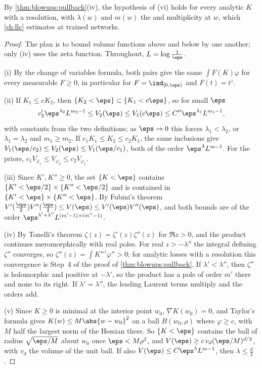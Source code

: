 \begin{refsection}
By \cref{thm:blowups:pullback}(iv), the hypothesis of (vi) holds for every analytic $K$ with a resolution, with $\lambda(w)$ and $m(w)$ the  and multiplicity at $w$, which \cref{ch:llc} estimates at trained networks.

\begin{proof}
The plan is to bound volume functions above and below by one another; only (iv) uses the zeta function. Throughout, $L=\log\frac1\eps$.

(i) By the change of variables formula, both pairs give the same $\int F(K)\varphi$ for every measurable $F\ge0$, in particular for $F=\ind_{[0,\eps)}$ and $F(t)=t^z$.

(ii) If $K_1\le cK_2$, then $\{K_2<\eps\}\subset\{K_1<c\eps\}$, so for small $\eps$
\[
c'_2\eps^{\lambda_2}L^{m_2-1}\le V_2(\eps)\le V_1(c\eps)\le C''\eps^{\lambda_1}L^{m_1-1},
\]
with constants from the two definitions; as $\eps\to0$ this forces $\lambda_1<\lambda_2$, or $\lambda_1=\lambda_2$ and $m_1\ge m_2$. If $c_1K_1\le K_2\le c_2K_1$, the same inclusions give $V_1(\eps/c_2)\le V_2(\eps)\le V_1(\eps/c_1)$, both of the order $\eps^\lambda L^{m-1}$. For the priors, $c_1V_{\varphi_1}\le V_{\varphi_2}\le c_2V_{\varphi_1}$.

(iii) Since $K',K''\ge0$, the set $\{K<\eps\}$ contains $\{K'<\eps/2\}\times\{K''<\eps/2\}$ and is contained in $\{K'<\eps\}\times\{K''<\eps\}$. By Fubini's theorem $V'(\frac\eps2)V''(\frac\eps2)\le V(\eps)\le V'(\eps)V''(\eps)$, and both bounds are of the order $\eps^{\lambda'+\lambda''}L^{(m'-1)+(m''-1)}$.

(iv) By Tonelli's theorem $\zeta(z)=\zeta'(z)\zeta''(z)$ for $\Re z>0$, and the product continues meromorphically with real poles. For real $z>-\lambda''$ the integral defining $\zeta''$ converges, so $\zeta''(z)=\int K''^z\varphi''>0$; for analytic losses with a resolution this convergence is Step~4 of the proof of \cref{thm:blowups:pullback}. If $\lambda'<\lambda''$, then $\zeta''$ is holomorphic and positive at $-\lambda'$, so the product has a pole of order $m'$ there and none to its right. If $\lambda'=\lambda''$, the leading Laurent terms multiply and the orders add.

(v) Since $K\ge0$ is minimal at the interior point $w_0$, $\nabla K(w_0)=0$, and Taylor's formula gives $K(w)\le M\abs{w-w_0}^2$ on a ball $B(w_0,\rho)$ where $\varphi\ge c$, with $M$ half the largest norm of the Hessian there. So $\{K<\eps\}$ contains the ball of radius $\sqrt{\eps/M}$ about $w_0$ once $\eps<M\rho^2$, and $V(\eps)\ge c\,v_d(\eps/M)^{d/2}$, with $v_d$ the volume of the unit ball. If also $V(\eps)\le C\eps^\lambda L^{m-1}$, then $\lambda\le\frac d2$.


\end{proof}
\end{refsection}
